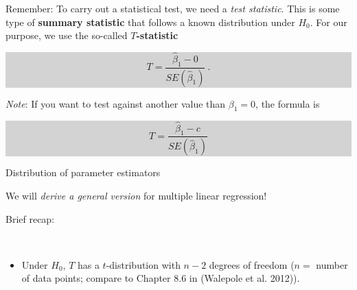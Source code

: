 \documentclass[10pt,ignorenonframetext,]{beamer}
\providecommand{\tightlist}{%
  \setlength{\itemsep}{0pt}\setlength{\parskip}{0pt}}
\begin{document}
\begin{frame}

Remember: To carry out a statistical test, we need a \emph{test
statistic}. This is some type of \textbf{summary statistic} that follows
a known distribution under \(H_0\). For our purpose, we use the
so-called \textbf{\(T\)-statistic}

\begin{center}
\colorbox{lightgray}{\begin{minipage}{5cm}
\begin{equation*}\label{eq:beta}
T=\frac{\hat\beta_1 - 0}{SE(\hat\beta_1)}\ . 
\end{equation*}
\end{minipage}}
\end{center}

\vspace{4mm} \emph{Note}: If you want to test against another value than
\(\beta_1=0\), the formula is

\begin{center}
\colorbox{lightgray}{\begin{minipage}{5cm}
\begin{equation*}
T=\frac{\hat\beta_1 - c}{SE(\hat\beta_1)}
\end{equation*}
\end{minipage}}
\end{center}

\end{frame}

\begin{frame}

\begin{block}{Distribution of parameter estimators}

\vspace{2mm}

We will \emph{derive a general version} for multiple linear regression!

Brief recap:

\(~\)

\begin{itemize}
\tightlist
\item
  Under \(H_0\), \(T\) has a \(t\)-distribution with \(n-2\) degrees of
  freedom (\(n=\) number of data points; compare to Chapter 8.6 in
  (Walepole et al. 2012)).
\end{itemize}

\end{block}

\end{frame}
\end{document}

